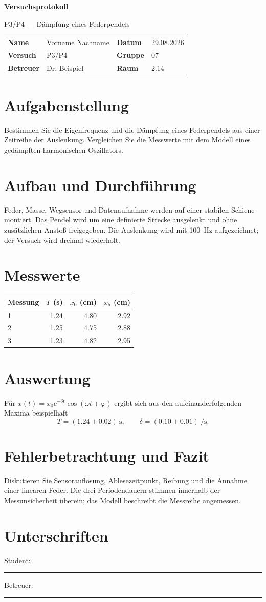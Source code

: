 \documentclass[11pt,a4paper]{article}
\begin{document}
\begin{center}
 {\color{kitblue}\LARGE\bfseries Versuchsprotokoll}\par\medskip
 {\large P3/P4 — Dämpfung eines Federpendels}\par
\end{center}
\begin{tabularx}{\linewidth}{@{}>{\bfseries}lX>{\bfseries}lX@{}}
 Name & Vorname Nachname & Datum & 29.08.2026\\
 Versuch & P3/P4 & Gruppe & 07\\
 Betreuer & Dr. Beispiel & Raum & 2.14
\end{tabularx}
\section*{Aufgabenstellung}
Bestimmen Sie die Eigenfrequenz und die Dämpfung eines Federpendels aus einer
Zeitreihe der Auslenkung. Vergleichen Sie die Messwerte mit dem Modell eines
gedämpften harmonischen Oszillators.
\section*{Aufbau und Durchführung}
Feder, Masse, Wegsensor und Datenaufnahme werden auf einer stabilen Schiene
montiert. Das Pendel wird um eine definierte Strecke ausgelenkt und ohne
zusätzlichen Anstoß freigegeben. Die Auslenkung wird mit \SI{100}{Hz}
aufgezeichnet; der Versuch wird dreimal wiederholt.
\section*{Messwerte}
\begin{tabular}{@{}l@{\quad}rr@{\quad}r@{}}
\toprule
Messung & $T$ (s) & $x_0$ (cm) & $x_5$ (cm)\\\midrule
1 & 1.24 & 4.80 & 2.92\\
2 & 1.25 & 4.75 & 2.88\\
3 & 1.23 & 4.82 & 2.95\\
\bottomrule
\end{tabular}
\section*{Auswertung}
Für $x(t)=x_0 e^{-\delta t}\cos(\omega t+\varphi)$ ergibt sich aus den
aufeinanderfolgenden Maxima beispielhaft
\[T=(1.24\pm0.02)\ \si{\second},\qquad
\delta=(0.10\pm0.01)\ \si{\per\second}.\]
\section*{Fehlerbetrachtung und Fazit}
Diskutieren Sie Sensorauflösung, Ablesezeitpunkt, Reibung und die Annahme
einer linearen Feder. Die drei Periodendauern stimmen innerhalb der
Messunsicherheit überein; das Modell beschreibt die Messreihe angemessen.
\section*{Unterschriften}
\noindent Student: \rule{45mm}{.4pt}\hfill Betreuer: \rule{40mm}{.4pt}
\end{document}
